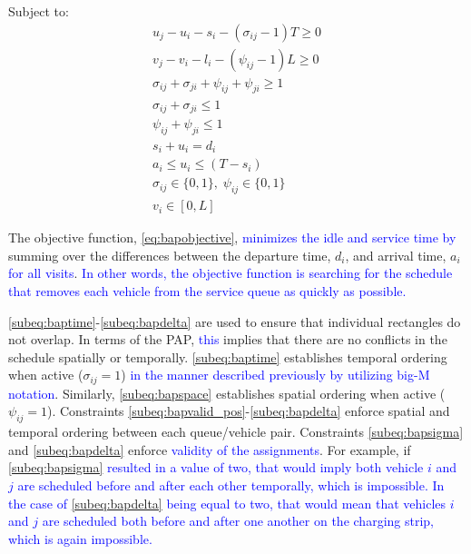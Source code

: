 \documentclass[utf8]{FrontiersinHarvard}
\begin{document}
Subject to:
\begin{subequations}
\label{eq:bapconstrs}
\begin{align}
    u_j - u_i - s_i - (\sigma_{ij} - 1)T \geq 0   \label{subeq:baptime}          \\
    v_j - v_i - l_i - (\psi_{ij} - 1)L \geq 0   \label{subeq:bapspace}           \\
    \sigma_{ij} + \sigma_{ji} + \psi_{ij} + \psi_{ji} \geq 1 \label{subeq:bapvalid_pos}     \\
    \sigma_{ij} + \sigma_{ji} \leq 1                   \label{subeq:bapsigma}        \\
    \psi_{ij} + \psi_{ji} \leq 1                   \label{subeq:bapdelta}        \\
    s_i + u_i = d_i                       \label{subeq:bapdetach}       \\
    a_i \leq u_i \leq (T - s_i)                 \label{subeq:bapvalid_starts} \\
    \sigma_{ij} \in \{0,1\},\;\psi_{ij} \in \{0,1\}\; \label{subeq:bapsdspace}      \\
    v_i \in [0, L ]                         \label{subeq:bapvspace}
\end{align}
\end{subequations}

\noindent The objective function, \autoref{eq:bapobjective}, \textcolor{blue}{minimizes the idle and service time by} summing over the differences between the departure time, \(d_i\), and arrival time, \(a_i\)
\textcolor{blue}{for all visits}. \textcolor{blue}{In other words, the objective function is searching for the schedule that removes each vehicle from the service queue as quickly as possible.}

\autoref{subeq:baptime}-\autoref{subeq:bapdelta} are used to ensure that individual rectangles do not overlap. In terms
of the PAP, \textcolor{blue}{this} implies that there are no conflicts in the schedule spatially or
temporally. \autoref{subeq:baptime} establishes temporal ordering when active (\(\sigma_{ij}=1\)) \textcolor{blue}{in the manner described previously by utilizing big-M notation}. Similarly, \autoref{subeq:bapspace} establishes spatial
ordering when active (\(\psi_{ij} =1\)). Constraints \autoref{subeq:bapvalid_pos}-\autoref{subeq:bapdelta} enforce spatial
and temporal ordering between each queue/vehicle pair. Constraints \autoref{subeq:bapsigma} and \autoref{subeq:bapdelta}
enforce \textcolor{blue}{validity of the assignments}. For example, if
\textcolor{blue}{{\autoref{subeq:bapsigma}} resulted in a value of two, that would imply both vehicle $i$ and $j$ are scheduled before and after each other temporally, which is impossible. In the case of {\autoref{subeq:bapdelta}} being equal to two, that would mean that vehicles $i$ and $j$ are scheduled both before and after one another on the charging strip, which is again impossible.}
\end{document}
